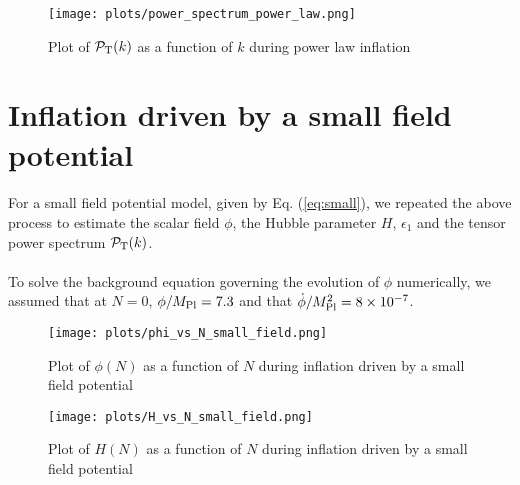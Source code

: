 \documentclass[12pt,a4paper,oneside]{book}
\begin{document}
\begin{figure}
\begin{center}
\texttt{[image: plots/power\_spectrum\_power\_law.png]}
\caption[Plot of $\mathcal{P}_{\rm T}(k)$ as a function of $k$ during power law inflation]{Plot of $\mathcal{P}_{\rm T}(k)$ as a function of $k$ during power law inflation}
\label{tps_p}
\end{center}
\end{figure}

\section{Inflation driven by a small field potential}

\paragraph*{} For a small field potential model, given by Eq. (\ref{eq:small}), we repeated the above process to estimate the scalar field $\phi$, 
the Hubble parameter $H$, $\epsilon_1$ and the tensor power spectrum $\mathcal{P}_{\rm T}(k)$.

\paragraph*{} To solve the background equation governing the evolution of $\phi$ numerically, we assumed that at
$N = 0$, $\phi/M_{\rm Pl} = 7.3$ and that ${\dot{\phi}}/M_{\rm Pl}^2 = 8\times10^{-7}$.

\begin{figure}
\begin{center}
\texttt{[image: plots/phi\_vs\_N\_small\_field.png]}
\caption[Plot of $\phi(N)$ as a function of $N$ during inflation driven by a small field potential ]{Plot of $\phi(N)$ as a function of $N$ during inflation driven by a small field potential}
\label{fig:field_sma}
\end{center}
\end{figure}

\begin{figure}
\begin{center}
\texttt{[image: plots/H\_vs\_N\_small\_field.png]}
\caption[Plot of $H(N)$ as a function of $N$ during inflation driven by a small field potential]{Plot of $H(N)$ as a function of $N$ during inflation driven by a small field potential}
\label{fig:Hubble_sma}
\end{center}
\end{figure}
\end{document}
